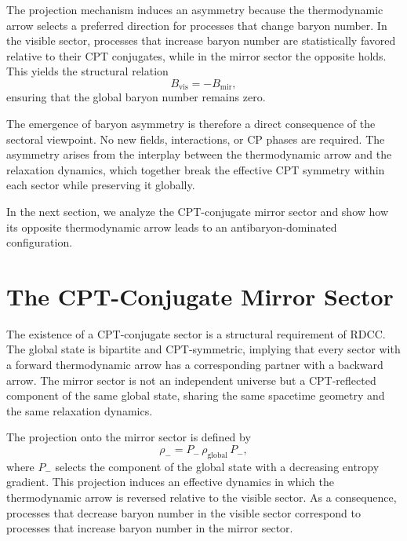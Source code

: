 \documentclass[11pt,a4paper]{article}
\newcommand{\rglobal}{\rho_{\mathrm{global}}}
\newcommand{\rminus}{\rho_{-}}
\begin{document}
The projection mechanism induces an asymmetry because the thermodynamic arrow
selects a preferred direction for processes that change baryon number. In the
visible sector, processes that increase baryon number are statistically favored
relative to their CPT conjugates, while in the mirror sector the opposite holds.
This yields the structural relation
\begin{equation}
B_{\mathrm{vis}} = -B_{\mathrm{mir}},
\end{equation}
ensuring that the global baryon number remains zero.

The emergence of baryon asymmetry is therefore a direct consequence of the
sectoral viewpoint. No new fields, interactions, or CP phases are required. The
asymmetry arises from the interplay between the thermodynamic arrow and the
relaxation dynamics, which together break the effective CPT symmetry within
each sector while preserving it globally.

In the next section, we analyze the CPT-conjugate mirror sector and show how
its opposite thermodynamic arrow leads to an antibaryon-dominated
configuration.




\section{The CPT-Conjugate Mirror Sector}

The existence of a CPT-conjugate sector is a structural requirement of RDCC.
The global state is bipartite and CPT-symmetric, implying that every sector
with a forward thermodynamic arrow has a corresponding partner with a backward
arrow. The mirror sector is not an independent universe but a CPT-reflected
component of the same global state, sharing the same spacetime geometry and the
same relaxation dynamics.

The projection onto the mirror sector is defined by
\begin{equation}
\rminus = P_{-}\,\rglobal\,P_{-},
\end{equation}
where $P_{-}$ selects the component of the global state with a decreasing
entropy gradient. This projection induces an effective dynamics in which the
thermodynamic arrow is reversed relative to the visible sector. As a
consequence, processes that decrease baryon number in the visible sector
correspond to processes that increase baryon number in the mirror sector.
\end{document}
